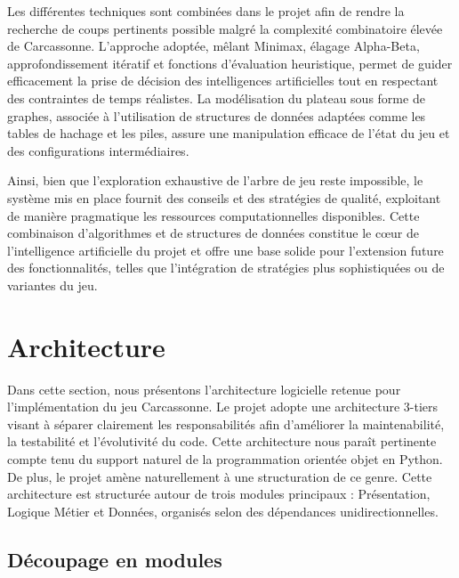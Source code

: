 \documentclass[11pt]{article}
\begin{document}
Les différentes techniques sont combinées dans le projet afin de rendre la recherche de coups pertinents possible malgré la complexité combinatoire élevée de Carcassonne. 
L’approche adoptée, mêlant Minimax, élagage Alpha-Beta, approfondissement itératif et fonctions d’évaluation heuristique, permet de guider efficacement la prise de décision des intelligences artificielles tout en respectant des contraintes de temps réalistes.
La modélisation du plateau sous forme de graphes, associée à l’utilisation de structures de données adaptées comme les tables de hachage et les piles, assure une manipulation efficace de l’état du jeu et des configurations intermédiaires.

Ainsi, bien que l’exploration exhaustive de l’arbre de jeu reste impossible, le système mis en place fournit des conseils et des stratégies de qualité, exploitant de manière pragmatique les ressources computationnelles disponibles. 
Cette combinaison d’algorithmes et de structures de données constitue le cœur de l’intelligence artificielle du projet et offre une base solide pour l’extension future des fonctionnalités, telles que l’intégration de stratégies plus sophistiquées ou de variantes du jeu.



\section{Architecture}
Dans cette section, nous présentons l’architecture logicielle retenue pour l’implémentation du jeu Carcassonne.
Le projet adopte une architecture 3-tiers\cite{n_tier_architecture} visant à séparer clairement les responsabilités afin d’améliorer la maintenabilité, la testabilité et l’évolutivité du code.
Cette architecture nous paraît pertinente compte tenu du support naturel de la programmation orientée objet en Python. De plus, le projet amène naturellement à une structuration de ce genre.
Cette architecture est structurée autour de trois modules principaux : Présentation, Logique Métier et Données, organisés selon des dépendances unidirectionnelles.

\subsection{Découpage en modules}
\end{document}
